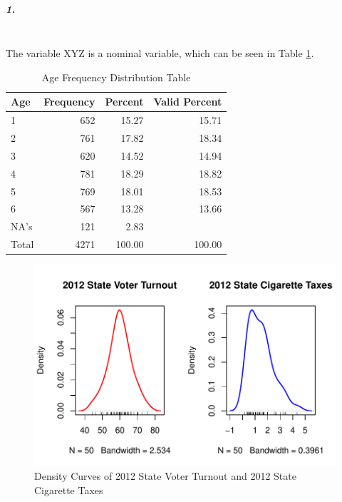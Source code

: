 \documentclass[12pt, letterpaper]{article}
\begin{document}
 

\setlength{\parindent}{0.85cm}
\subparagraph{1.} 
\noindent \\ The variable XYZ is a nominal variable, which can be seen in Table \ref{t1}.

\begin{table}[ht]\caption{Age Frequency Distribution Table}\label{t1}
	\centering
	\begin{tabular}{lrrr}
		\hline
		Age & Frequency & Percent & Valid Percent \\ 
		\hline
		1 & 652 & 15.27 & 15.71 \\ 
		2 & 761 & 17.82 & 18.34 \\ 
		3 & 620 & 14.52 & 14.94 \\ 
		4 & 781 & 18.29 & 18.82 \\ 
		5 & 769 & 18.01 & 18.53 \\ 
		6 & 567 & 13.28 & 13.66 \\ 
		NA's & 121 & 2.83 &  \\ 
		\hline
		Total & 4271 & 100.00 & 100.00 \\ 
		\hline
	\end{tabular}
\end{table}

\pagebreak

\begin{figure}\caption{Density Curves of 2012 State Voter Turnout and 2012 State Cigarette Taxes}\label{f3}
	\includegraphics[scale=.9]{votecigsden.pdf}
\end{figure}
\end{document}
